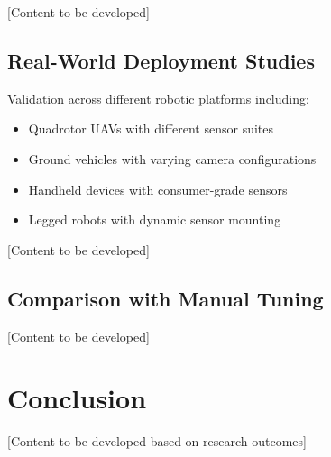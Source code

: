[Content to be developed]

\subsection{Real-World Deployment Studies}

Validation across different robotic platforms including:
\begin{itemize}
    \item Quadrotor UAVs with different sensor suites
    \item Ground vehicles with varying camera configurations
    \item Handheld devices with consumer-grade sensors
    \item Legged robots with dynamic sensor mounting
\end{itemize}

[Content to be developed]

\subsection{Comparison with Manual Tuning}

[Content to be developed]

\section{Conclusion}

[Content to be developed based on research outcomes]